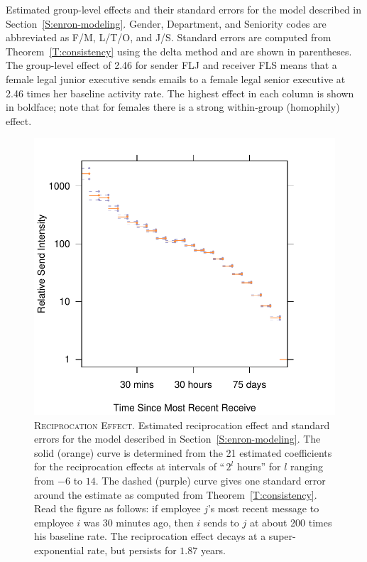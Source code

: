 \documentclass[aoas,preprint]{imsart}
\begin{document}
\begin{table}[h]
    \tiny
    
    \caption{
        Estimated group-level effects and their standard errors for the
        model described in Section~\ref{S:enron-modeling}.  Gender,
        Department, and Seniority codes are abbreviated as F/M, L/T/O,
        and J/S.  Standard errors are computed from
        Theorem~\ref{T:consistency} using the delta method and are shown in
        parentheses.  The group-level effect of 2.46 for sender FLJ 
        and receiver FLS means that a female legal junior executive sends
        emails to a female legal senior executive at 2.46 times her baseline
        activity rate.  The highest effect in each column is shown in
        boldface; note that for females there is a strong within-group
        (homophily) effect.
    }
    \label{T:group-effects}
\end{table}

\begin{figure}[h]
    \includegraphics[scale=0.6]{figures/reciprocation}
    \caption{
        \textsc{Reciprocation Effect.}
        Estimated reciprocation effect and standard errors for the
        model described in Section~\ref{S:enron-modeling}.  The solid
        (orange) curve is determined from the 21 estimated coefficients
        for the reciprocation effects at intervals of ``\,$2^l$ hours''
        for $l$ ranging from $-6$ to $14$.  The dashed (purple) curve gives
        one standard error around the estimate as computed from 
        Theorem~\ref{T:consistency}.  Read the figure as follows: if employee
        $j$'s most recent message to employee $i$ was 30 minutes ago, then
        $i$ sends to $j$ at about 200 times his baseline rate.
        The reciprocation effect decays at a super-exponential rate, but
        persists for $1.87$ years.
    }\label{F:reciprocation}
\end{figure}
\end{document}

